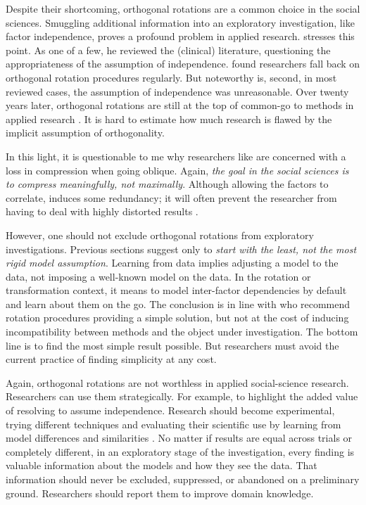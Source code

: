 \documentclass[jou, 11pt]{apa7}
\begin{document}
Despite their shortcoming, orthogonal rotations are a common choice in the
social sciences. Smuggling additional information into an exploratory
investigation, like factor independence, proves a profound problem in applied
research. \textcite{Loo1979} stresses this point. As one of a few, he reviewed
the (clinical) literature, questioning the appropriateness of the assumption of
independence. \textcite{Loo1979} found researchers fall back on orthogonal
rotation procedures regularly. But noteworthy is, second, in most reviewed
cases, the assumption of independence was unreasonable. Over twenty years
later, orthogonal rotations are still at the top of common-go to methods in
applied research \parencite{Ford1986, Costello2005}. It is hard to estimate how
much research is flawed by the implicit assumption of
orthogonality.

In this light, it is questionable to me why researchers like
\textcite{Bortz2016} are concerned with a loss in compression when going
oblique. Again, \textit{the goal in the social sciences is to compress
meaningfully, not maximally}. Although allowing the factors to correlate,
induces some redundancy; it will often prevent the researcher from having to
deal with highly distorted results \parencite{Sass2010}.

However, one should not exclude orthogonal rotations from exploratory
investigations. Previous sections suggest only to \textit{start with the least,
not the most rigid model assumption}. Learning from data implies adjusting a
model to the data, not imposing a well-known model on the data. In the rotation
or transformation context, it means to model inter-factor dependencies by
default and learn about them on the go. The conclusion is in line with
\textcite{Sass2010, Muthen1984} who recommend rotation procedures providing a
simple solution, but not at the cost of inducing incompatibility between
methods and the object under investigation. The bottom line is to find the most
simple result possible. But researchers must avoid the current practice of
finding simplicity at any cost.

Again, orthogonal rotations are not worthless in applied social-science research.
Researchers can use them strategically. For example, to highlight the added
value of resolving to assume independence. Research should become experimental,
trying different techniques and evaluating their scientific use by learning
from model differences and similarities \parencite[p. 642]{Tabachnick2007}. No
matter if results are equal across trials or completely different, in an
exploratory stage of the investigation, every finding is valuable information
about the models and how they see the data. That information should never be
excluded, suppressed, or abandoned on a preliminary ground. Researchers should
report them to improve domain knowledge.
\end{document}
